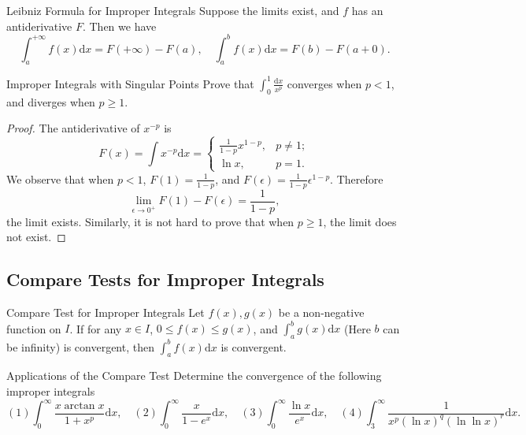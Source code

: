 \begin{theorem}{Leibniz Formula for Improper Integrals}{}
  Suppose the limits exist, and $f$ has an antiderivative $F$.
  Then we have
  \begin{equation}
    \int_a^{+\infty} f(x) \mathrm{d} x = F(+\infty) - F(a), \quad
    \int_a^b f(x) \mathrm{d} x = F(b) - F(a+0).
  \end{equation}
\end{theorem}

\begin{example}{Improper Integrals with Singular Points}{}
  Prove that $\int_0^1 \frac{\mathrm{d} x}{x^p}$ converges when $p < 1$,
  and diverges when $p \geq 1$.
\end{example}

\begin{proof}
  The antiderivative of $x^{-p}$ is
  \begin{equation}
    F(x) = \int x^{-p}\mathrm{d} x =
    \begin{cases}
      \frac{1}{1-p} x^{1-p}, & p \neq 1;\\
      \ln x, & p =1.
    \end{cases}
  \end{equation}
  We observe that when $p < 1$, $F(1) = \frac{1}{1-p}$, and $F(\epsilon) =
  \frac{1}{1-p} \epsilon^{1-p}$. Therefore
  \begin{equation}
    \lim \limits _{\epsilon \rightarrow 0^+} F(1) - F(\epsilon) = \frac{1}{1-p},
  \end{equation}
  the limit exists. Similarly, it is not hard to prove that when $p \geq 1$, the
  limit does not exist.
\end{proof}

\subsection{Compare Tests for Improper Integrals}

\begin{proposition}{Compare Test for Improper Integrals}{}
  Let $f(x), g(x)$ be a non-negative function on $I$.
  If for any $x \in I$, $0 \leq f(x) \leq g(x)$, and $\int_a^bg(x)\mathrm{d} x$
  (Here $b$ can be infinity)
  is convergent, then $\int_a^b f(x)\mathrm{d} x$ is convergent.
\end{proposition}

\begin{example}{Applications of the Compare Test}{}
  Determine the convergence of the following improper integrals
  \begin{equation}
    (1) \int_0^{\infty} \frac{x \arctan x}{1 + x^p}\mathrm{d} x, \quad
    (2) \int_0^{\infty} \frac{x}{1-e^x}\mathrm{d} x, \quad
    (3) \int_0^{\infty} \frac{\ln x}{e^x}\mathrm{d}x, \quad
    (4) \int_3^{\infty} \frac{1}{x^p(\ln x)^q (\ln \ln x)^r}\mathrm{d} x.
  \end{equation}
\end{example}

